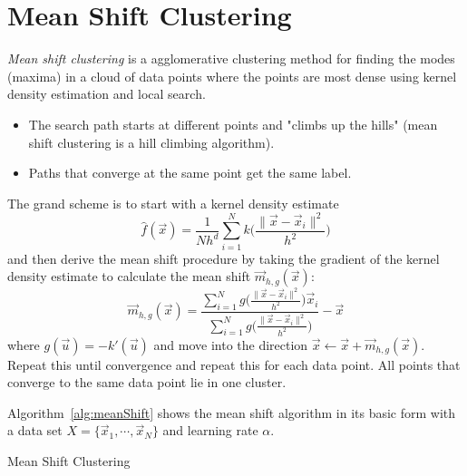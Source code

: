 	\section{Mean Shift Clustering}
		\emph{Mean shift clustering} is a agglomerative clustering method for finding the modes (maxima) in a cloud of data points where the points are most dense using kernel density estimation and local search.
		\begin{itemize}
			\item The search path starts at different points and "climbs up the hills" (mean shift clustering is a hill climbing algorithm).
			\item Paths that converge at the same point get the same label.
		\end{itemize}

		The grand scheme is to start with a kernel density estimate
		\begin{equation}
			\hat{f}(\vec{x}) = \frac{1}{Nh^d} \sum_{i = 1}^{N} k\Bigg( \frac{\lVert \vec{x} - \vec{x}_i \rVert^2}{h^2} \Bigg)
		\end{equation}
		and then derive the mean shift procedure by taking the gradient of the kernel density estimate to calculate the mean shift \( \vec{m}_{h, g}(\vec{x}) \):
		\begin{equation}
			\vec{m}_{h, g}(\vec{x}) = \frac{\sum_{i = 1}^{N} g\Big( \frac{\lVert \vec{x} - \vec{x}_i \rVert^2}{h^2} \Big) \vec{x}_i}{\sum_{i = 1}^{N} g\Big( \frac{\lVert \vec{x} - \vec{x}_i \rVert^2}{h^2} \Big)} - \vec{x}
		\end{equation}
		where \( g(\vec{u}) = -k'(\vec{u}) \) and move into the direction \( \vec{x} \gets \vec{x} + \vec{m}_{h, g}(\vec{x}) \). Repeat this until convergence and repeat this for each data point. All points that converge to the same data point lie in one cluster.

		Algorithm~\ref{alg:meanShift} shows the mean shift algorithm in its basic form with a data set \( X = \{ \vec{x}_1, \cdots, \vec{x}_N \} \) and learning rate \(\alpha\).

		\begin{algorithm}

			\caption{Mean Shift Clustering}
			\label{alg:meanShift}
		\end{algorithm}

